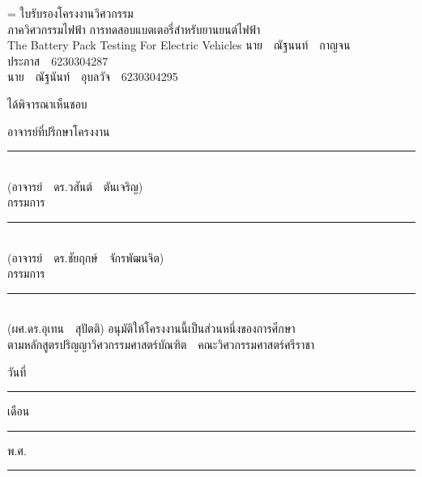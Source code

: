 {\centering
\parskip=\baselineskip
\renewcommand{\baselinestretch}{0}
\fontsize{12pt}{0}
{\fontsize{14pt}{0}\selectfont ใบรับรองโครงงานวิศวกรรม\\ภาควิศวกรรมไฟฟ้า}
{\fontsize{14pt}{0}\selectfont การทดสอบแบตเตอรี่สำหรับยานยนต์ไฟฟ้า\\The Battery Pack Testing For Electric Vehicles}
\vfill
นาย\ \ ณัฐนนท์\ \ กาญจนประภาส\ \ 6230304287\\
นาย\ \ ณัฐนันท์\ \ อุบลวัจ\ \ 6230304295\\
\begin{flushleft}
ได้พิจารณาเห็นชอบ
\end{flushleft}
อาจารย์ที่ปรึกษาโครงงาน\noindent\rule{190pt}{0.4pt}\\
(อาจารย์\ \ ดร.วสันต์\ \ ตันเจริญ)\\
กรรมการ\noindent\rule{250pt}{0.4pt}\\
(อาจารย์\ \ ดร.ชัยฤกษ์\ \ จักรพัฒนจิต)\\
กรรมการ\noindent\rule{250pt}{0.4pt}\\
(ผศ.ดร.อุเทน\ \ สุปัตติ)
\vfill
อนุมัติให้โครงงานนี้เป็นส่วนหนึ่งของการศีกษา\\
ตามหลักสูตรปริญญาวิศวกรรมศาสตร์บัณฑิต\ \ คณะวิศวกรรมศาสตร์ศรีราชา\par}
\vfill
\begin{flushright}
วันที่\noindent\rule{3em}{0.4pt}
เดือน\noindent\rule{3em}{0.4pt}
พ.ศ.\noindent\rule{3em}{0.4pt}
\end{flushright}
\cleardoublepage	
\newpage



